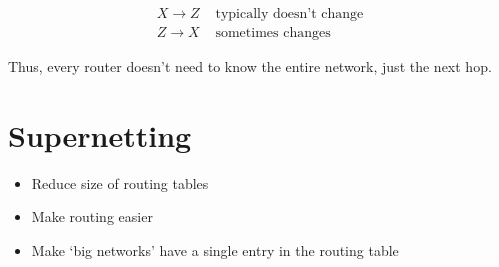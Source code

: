 \documentclass{article}
\begin{document}
\begin{align*}
    X \rightarrow Z & \text{ typically doesn't change} \\
    Z \rightarrow X & \text{ sometimes changes}
\end{align*}

Thus, every router doesn't need to know the entire network, just the next hop.

\section*{Supernetting}
\begin{itemize}
    \item Reduce size of routing tables
    \item Make routing easier
    \item Make `big networks' have a single entry in the routing table
\end{itemize}
\end{document}
